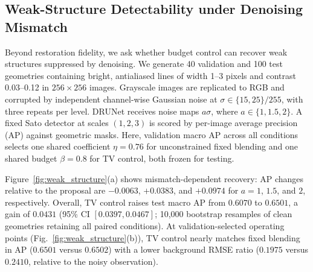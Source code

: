 \subsection{Weak-Structure Detectability under Denoising Mismatch}
\label{sec:weak_structure}
Beyond restoration fidelity, we ask whether budget control can recover
weak structures suppressed by denoising. We generate 40 validation and
100 test geometries containing bright, antialiased lines of width 1--3
pixels and contrast 0.03--0.12 in $256\times256$ images. Grayscale images
are replicated to RGB and corrupted by independent channel-wise Gaussian
noise at $\sigma\in\{15,25\}/255$, with three repeats per level. DRUNet
receives noise maps $a\sigma$, where $a\in\{1,1.5,2\}$. A fixed Sato
detector at scales $(1,2,3)$ is scored by per-image average precision
(AP) against geometric masks. Here, validation macro AP across all
conditions selects one shared coefficient $\eta=0.76$ for unconstrained
fixed blending and one shared budget $\beta=0.8$ for TV control, both
frozen for testing.

Figure~\ref{fig:weak_structure}(a) shows mismatch-dependent recovery:
AP changes relative to the proposal are $-0.0063$, $+0.0383$, and
$+0.0974$ for $a=1$, $1.5$, and $2$, respectively. Overall, TV control
raises test macro AP from $0.6070$ to $0.6501$, a gain of $0.0431$
(95\% CI $[0.0397,0.0467]$; 10,000 bootstrap resamples of clean geometries
retaining all paired conditions). At validation-selected operating points
(Fig.~\ref{fig:weak_structure}(b)), TV control nearly matches fixed
blending in AP ($0.6501$ versus $0.6502$) with a lower background RMSE
ratio ($0.1975$ versus $0.2410$, relative to the noisy observation).
